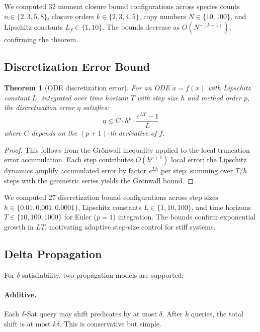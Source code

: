 \documentclass[11pt]{article}
\newtheorem{theorem}{Theorem}
\begin{document}
We computed 32 moment closure bound configurations across species
counts $n \in \{2,3,5,8\}$, closure orders $k \in \{2,3,4,5\}$,
copy numbers $N \in \{10, 100\}$, and Lipschitz constants
$L_f \in \{1, 10\}$. The bounds decrease as $O(N^{-(k+1)})$,
confirming the theorem.

\subsection{Discretization Error Bound}

\begin{theorem}[ODE discretization error]
\label{thm:disc}
For an ODE $\dot{x} = f(x)$ with Lipschitz constant $L$, integrated
over time horizon $T$ with step size $h$ and method order $p$, the
discretization error $\eta$ satisfies:
\begin{equation}
\eta \leq C \cdot h^p \cdot \frac{e^{LT} - 1}{L}
\end{equation}
where $C$ depends on the $(p+1)$-th derivative of $f$.
\end{theorem}

\begin{proof}
This follows from the Gr\"onwall inequality applied to the local
truncation error accumulation. Each step contributes $O(h^{p+1})$ local
error; the Lipschitz dynamics amplify accumulated error by factor
$e^{Lh}$ per step; summing over $T/h$ steps with the geometric series
yields the Gr\"onwall bound.
\end{proof}

We computed 27 discretization bound configurations across step sizes
$h \in \{0.01, 0.001, 0.0001\}$, Lipschitz constants
$L \in \{1, 10, 100\}$, and time horizons $T \in \{10, 100, 1000\}$
for Euler ($p=1$) integration. The bounds confirm exponential growth
in $LT$, motivating adaptive step-size control for stiff systems.

\subsection{Delta Propagation}

For $\delta$-satisfiability, two propagation models are supported:

\paragraph{Additive.} Each $\delta$-Sat query may shift predicates by
at most $\delta$. After $k$ queries, the total shift is at most
$k\delta$. This is conservative but simple.
\end{document}
